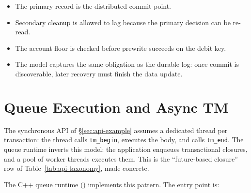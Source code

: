 \begin{itemize}
    \item The primary record is the distributed commit point.
    \item Secondary cleanup is allowed to lag because the primary decision can be re-read.
    \item The account floor is checked before prewrite succeeds on the debit key.
    \item The model captures the same obligation as the durable log: once commit is discoverable, later recovery must finish the data update.
\end{itemize}

\section{Queue Execution and Async TM}
\label{sec:queue-execution}

The synchronous API of \S\ref{sec:api-example} assumes a dedicated thread
per transaction: the thread calls \texttt{tm\_begin}, executes the body, and
calls \texttt{tm\_end}.  The queue runtime inverts this model: the application
enqueues transactional closures, and a pool of worker threads executes them.
This is the ``future-based closure'' row of Table~\ref{tab:api-taxonomy}, made
concrete.

\begin{center}
\end{center}

\noindent
The C++ queue runtime ()
implements this pattern.  The entry point is:

